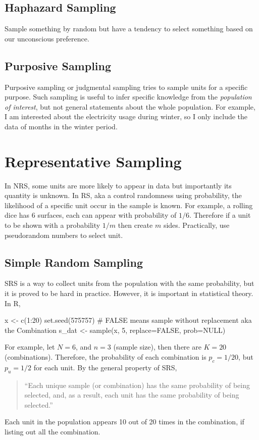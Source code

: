 \subsection{Haphazard Sampling}
Sample something by random but have a tendency to select something based on our unconscious preference.

\subsection{Purposive Sampling}
Purposive sampling or judgmental sampling tries to sample units for a specific purpose. Such sampling is useful to infer specific knowledge from the \emph{population of interest}, but not general statements about the whole
population. For example, I am interested about the electricity usage during winter, so I only include the data of months in the winter period. 

\section{Representative Sampling}
In NRS, some units are more likely to appear in data but importantly its quantity is unknown. In RS, aka a control randomness using probability, the likelihood of a specific unit occur in the sample is known. For example, 
a rolling dice has 6 surfaces, each can appear with probability of $1/6$. Therefore if a unit to be shown with a probability $1/m$ then create $m$ sides. Practically, use pseudorandom numbers to select unit.

\subsection{Simple Random Sampling}
\label{sec:SRS}
SRS is a way to collect units from the population with the same probability, but it is proved to be hard in practice. However, it is important in statistical theory. In R,
\begin{Rblock}
    x <- c(1:20)
    set.seed(575757)
    # FALSE means sample without replacement aka the Combination
    s_dat <- sample(x, 5, replace=FALSE, prob=NULL)
\end{Rblock}

For example, let $N=6$, and $n=3$ (sample size), then there are $K=20$ (combinations). Therefore, the probability of each combination is $p_c=1/20$, but $p_u=1/2$ for each unit. By the general property of SRS,
\begin{quote}
    ``Each unique sample (or combination) has the same probability of being selected, and, as a result, each unit has the same probability of being selected.''
\end{quote}
Each unit in the population appears 10 out of 20 times in the combination, if listing out all the combination. 

